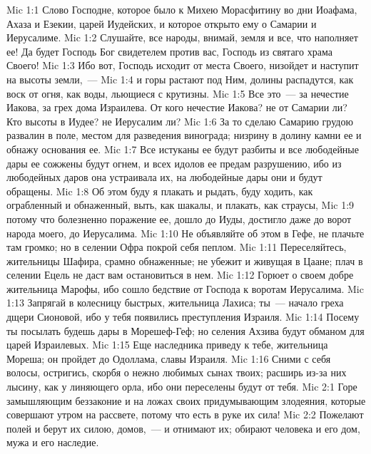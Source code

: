 \vs Mic 1:1 Слово Господне, которое было к Михею Морасфитину во дни Иоафама, Ахаза и Езекии, царей Иудейских, и которое открыто ему о Самарии и Иерусалиме.
\rsbpar\vs Mic 1:2 Слушайте, все народы, внимай, земля и все, что наполняет ее! Да будет Господь Бог свидетелем против вас, Господь из святаго храма Своего!
\vs Mic 1:3 Ибо вот, Господь исходит от места Своего, низойдет и наступит на высоты земли,~---
\vs Mic 1:4 и горы растают под Ним, долины распадутся, как воск от огня, как воды, льющиеся с крутизны.
\vs Mic 1:5 Все это~--- за нечестие Иакова, за грех дома Израилева. От кого нечестие Иакова? не от Самарии ли? Кто  высоты в Иудее? не Иерусалим ли?
\vs Mic 1:6 За то сделаю Самарию грудою развалин в поле, местом для разведения винограда; низрину в долину камни ее и обнажу основания ее.
\vs Mic 1:7 Все истуканы ее будут разбиты и все любодейные дары ее сожжены будут огнем, и всех идолов ее предам разрушению, ибо из любодейных даров она устраивала их, на любодейные дары они и будут обращены.
\vs Mic 1:8 Об этом буду я плакать и рыдать, буду ходить, как ограбленный и обнаженный, выть, как шакалы, и плакать, как страусы,
\vs Mic 1:9 потому что болезненно поражение ее, дошло до Иуды, достигло даже до ворот народа моего, до Иерусалима.
\vs Mic 1:10 Не объявляйте об этом в Гефе, не плачьте там громко; но в селении Офра покрой себя пеплом.
\vs Mic 1:11 Переселяйтесь, жительницы Шафира, срамно обнаженные; не убежит и живущая в Цаане; плач в селении Ецель не даст вам остановиться в нем.
\vs Mic 1:12 Горюет о своем добре жительница Марофы, ибо сошло бедствие от Господа к воротам Иерусалима.
\vs Mic 1:13 Запрягай в колесницу быстрых, жительница Лахиса; ты~--- начало греха дщери Сионовой, ибо у тебя появились преступления Израиля.
\vs Mic 1:14 Посему ты посылать будешь дары в Морешеф-Геф; но селения Ахзива будут обманом для царей Израилевых.
\vs Mic 1:15 Еще наследника приведу к тебе, жительница Мореша; он пройдет до Одоллама, славы Израиля.
\vs Mic 1:16 Сними с себя волосы, остригись, скорбя о нежно любимых сынах твоих; расширь из-за них лысину, как у линяющего орла, ибо они переселены будут от тебя.
\vs Mic 2:1 Горе замышляющим беззаконие и на ложах своих придумывающим злодеяния, которые совершают утром на рассвете, потому что есть в руке их сила!
\vs Mic 2:2 Пожелают полей и берут их силою, домов,~--- и отнимают их; обирают человека и его дом, мужа и его наследие.
